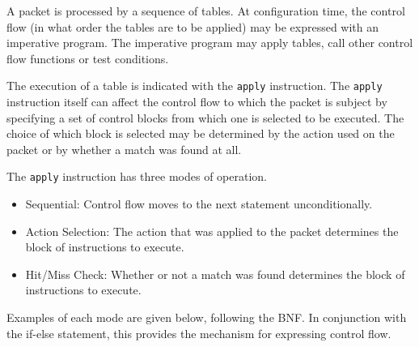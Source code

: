\documentclass[12pt]{article}
\begin{document}

A packet is processed by a sequence of \matchaction tables.  At configuration 
time, the control flow (in what order the tables are to be applied) may be 
expressed with an imperative program. The imperative program may apply tables, 
call other control flow functions or test conditions.

The execution of a table is indicated with the \texttt{apply} instruction. The \texttt{apply} instruction 
itself can affect the control flow to which the packet is subject by specifying 
a set of control blocks from which one is selected to be executed. The choice 
of which block is selected may be determined by the action used on the packet 
or by whether a match was found at all.

The \texttt{apply} instruction has three modes of operation.

\begin{itemize}
\item
Sequential: Control flow moves to the next statement unconditionally.
\item
Action Selection: The action that was applied to the packet determines the 
block of instructions to execute.
\item
Hit/Miss Check: Whether or not a match was found determines the block of instructions 
to execute.
\end{itemize}


Examples of each mode are given below, following the BNF. In conjunction with 
the if-else statement, this provides the mechanism for expressing control 
flow.
\end{document}
